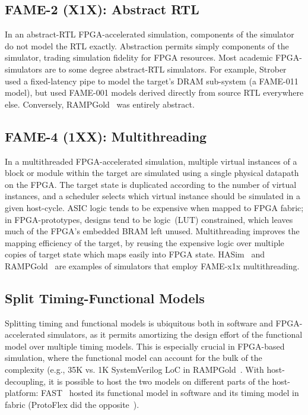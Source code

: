 \subsection{FAME-2 (X1X): Abstract RTL}

In an abstract-RTL FPGA-accelerated simulation, components of the simulator do
not model the RTL exactly. Abstraction permits simply components of the
simulator, trading simulation fidelity for FPGA resources. Most academic
FPGA-simulators are to some degree abstract-RTL simulators.  For example,
Strober~\cite{strober} used a fixed-latency pipe to model the target's DRAM
sub-system (a FAME-011 model), but used FAME-001 models derived directly from
source RTL everywhere else.  Conversely, RAMPGold~\cite{rampgold} was entirely
abstract.

\subsection{FAME-4 (1XX): Multithreading}

In a multithreaded FPGA-accelerated simulation, multiple virtual instances of a
block or module within the target are simulated using a single physical
datapath on the FPGA. The target state is duplicated according to the number of
virtual instances, and a scheduler selects which virtual instance should be
simulated in a given host-cycle. ASIC logic tends to be expensive when mapped
to FPGA fabric; in FPGA-prototypes, designs tend to be logic~(LUT) constrained,
which leaves much of the FPGA's embedded BRAM left unused.  Multithreading
improves the mapping efficiency of the target, by reusing the expensive logic
over multiple copies of target state which maps easily into FPGA state.
HASim~\cite{hasim} and RAMPGold~\cite{rampgold} are examples of simulators that
employ FAME-x1x multithreading.


\subsection{Split Timing-Functional Models}

Splitting timing and functional models is ubiquitous both in software and
FPGA-accelerated simulators, as it permits amortizing the design effort of the
functional model over multiple timing models. This is especially crucial in
FPGA-based simulation, where the functional model can account for the bulk of
the complexity (e.g., 35K vs. 1K SystemVerilog LoC in RAMPGold~\cite{rampgold}. With
host-decoupling, it is possible to host the two models on different parts of
the host-platform: FAST~\cite{fast} hosted its functional model in software and its
timing model in fabric (ProtoFlex did the opposite~\cite{protoflex}).

